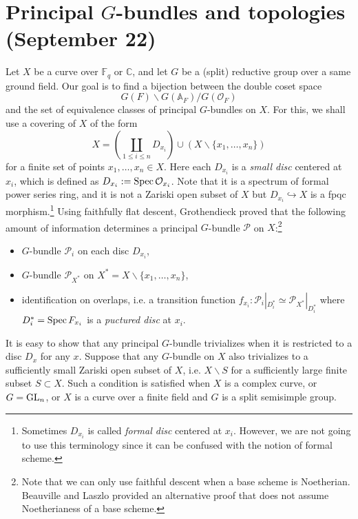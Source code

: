 \newpage
\section{Principal $G$-bundles and topologies (September 22)}

Let $X$ be a curve over $\mathbb{F}_q$ or $\mathbb{C}$, and
let $G$ be a (split) reductive group over a same ground field.
Our goal is to find a bijection between the double coset space
$$
G(F) \backslash G(\mathbb{A}_F) / G(\mathcal{O}_F)
$$
and the set of equivalence classes of principal $G$-bundles on $X$.
For this, we shall use a covering of $X$ of the form
$$
X = \left(\coprod_{1\leq i \leq n} D_{x_{i}}\right) \cup \left(X \backslash \{x_1, \dots, x_n\}\right)
$$
for a finite set of points $x_1, \dots, x_n \in X$.
Here each $D_{x_{i}}$ is a \emph{small disc} centered at $x_{i}$, which is defined as $D_{x_{i}}:= \operatorname{\mathrm{Spec}} \mathcal{O}_{x_{i}}$.
Note that it is a spectrum of formal power series ring, and it is not a Zariski open subset of $X$ but $D_{x_{i}} \hookrightarrow X$ is a fpqc morphism.\footnote{Sometimes $D_{x_{i}}$ is called
\emph{formal disc} centered at $x_{i}$. However, we are not going to use this terminology since it can be confused with the notion of formal scheme.}
Using faithfully flat descent, Grothendieck proved that the following amount of information determines a principal $G$-bundle $\mathcal{P}$ on $X$:\footnote{Note that we can only use faithful descent when a base scheme is Noetherian. Beauville and Laszlo provided an alternative
proof that does not assume Noetherianess of a base scheme.}
\begin{itemize}
    \item $G$-bundle $\mathcal{P}_i$ on each disc $D_{x_i}$,
    \item $G$-bundle $\mathcal{P}_{X^*}$ on $X^{*} = X \backslash \{x_1, \dots, x_n\}$,
    \item identification on overlaps, i.e. a transition function $f_{x_i}: \mathcal{P}_i|_{D_{i}^{*}} \simeq \mathcal{P}_{X^*}|_{D^{*}_i}$
    where $D_{i}^{*} = \operatorname{\mathrm{Spec}} F_{x_{i}}$ is a \emph{puctured disc} at $x_i$.
\end{itemize}
It is easy to show that any principal $G$-bundle trivializes when it is restricted to a disc $D_x$ for any $x$.
Suppose that any $G$-bundle on $X$ also trivializes to a sufficiently small Zariski open subset of $X$, i.e.
$X \backslash S$ for a sufficiently large finite subset $S \subset X$.
Such a condition is satisfied when $X$ is a complex curve, or $G = \operatorname{\mathrm{GL}}_n$, or $X$ is a curve over a finite field and $G$ is a split semisimple group.
